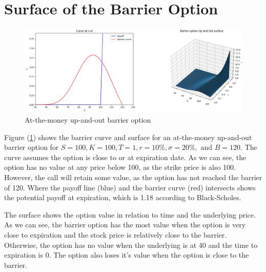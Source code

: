 \section{Surface of the Barrier Option}

\begin{figure}[H]
	\centering
	\includegraphics[width=.90\linewidth]{content/images/surface.png}
	\caption{At-the-money up-and-out barrier option}
	\label{fig:surface}
\end{figure}

Figure (\ref{fig:surface}) shows the barrier curve and surface for an at-the-money up-and-out barrier option for $S=100,K=100, T=1, r=10\%,\sigma=20\%, \text{ and }B=120$. The curve assumes the option is close to or at expiration date. As we can see, the option has no value at any price below 100, as the strike price is also 100. However, the call will retain some value, as the option has not reached the barrier of 120. Where the payoff line (blue) and the barrier curve (red) intersects shows the potential payoff at expiration, which is 1.18 according to Black-Scholes.

The surface shows the option value in relation to time and the underlying price. As we can see, the barrier option has the most value when the option is very close to expiration and the stock price is relatively close to the barrier. Otherwise, the option has no value when the underlying is at 40 and the time to expiration is 0. The option also loses it's value when the option is close to the barrier.
